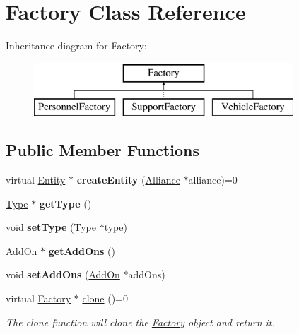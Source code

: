 \hypertarget{classFactory}{}\section{Factory Class Reference}
\label{classFactory}
Inheritance diagram for Factory\+:\begin{figure}[H]
\begin{center}
\leavevmode
\includegraphics[height=2.000000cm]{classFactory}
\end{center}
\end{figure}
\subsection*{Public Member Functions}
\begin{DoxyCompactItemize}
\item 
\mbox{\label{classFactory_a80da95da98b407948dc815f2bca6a283}} 
virtual \hyperlink{classEntity}{Entity} $\ast$ {\bfseries create\+Entity} (\hyperlink{classAlliance}{Alliance} $\ast$alliance)=0
\item 
\mbox{\label{classFactory_ac91051006ace7ec5bb6ecf0fe6d02d58}} 
\hyperlink{classType}{Type} $\ast$ {\bfseries get\+Type} ()
\item 
\mbox{\label{classFactory_a7484d514b094114231dbeb3df70e9d0b}} 
void {\bfseries set\+Type} (\hyperlink{classType}{Type} $\ast$type)
\item 
\mbox{\label{classFactory_a46f89194541b0246a017f1eaf51ab654}} 
\hyperlink{classAddOn}{Add\+On} $\ast$ {\bfseries get\+Add\+Ons} ()
\item 
\mbox{\label{classFactory_a958217b0bc29ce69ace69ade5e701984}} 
void {\bfseries set\+Add\+Ons} (\hyperlink{classAddOn}{Add\+On} $\ast$add\+Ons)
\item 
virtual \hyperlink{classFactory}{Factory} $\ast$ \hyperlink{classFactory_a00881ec5050751e4b747db5dfd266192}{clone} ()=0
\begin{DoxyCompactList}\small\item\em The clone function will clone the \hyperlink{classFactory}{Factory} object and return it. \end{DoxyCompactList}\end{DoxyCompactItemize}


